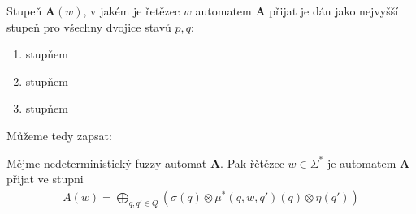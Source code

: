 \documentclass[a4paper,10pt]{article}
\begin{document}
Stupeň $\mathbf{A}(w)$, v jakém je řetězec $w$ automatem $\mathbf{A}$ přijat je dán jako nejvyšší stupeň pro všechny dvojice stavů $p, q$:
\begin{enumerate}
 \item stupňem 
 \item stupňem 
 \item stupňem 
\end{enumerate}

Můžeme tedy zapsat:

\begin{definition}\label{def-RetPriAut}
 Mějme nedeterministický fuzzy automat $\mathbf{A}$. Pak řětězec $w \in \Sigma^*$ je automatem $\mathbf{A}$ přijat ve stupni
 \begin{align} \label{eq-RetPriAut}
  A(w) = \bigoplus_{q, q' \in Q} (\sigma(q) \otimes \mu^*(q, w, q')(q) \otimes \eta(q'))
 \end{align}
\end{definition}
\end{document}

